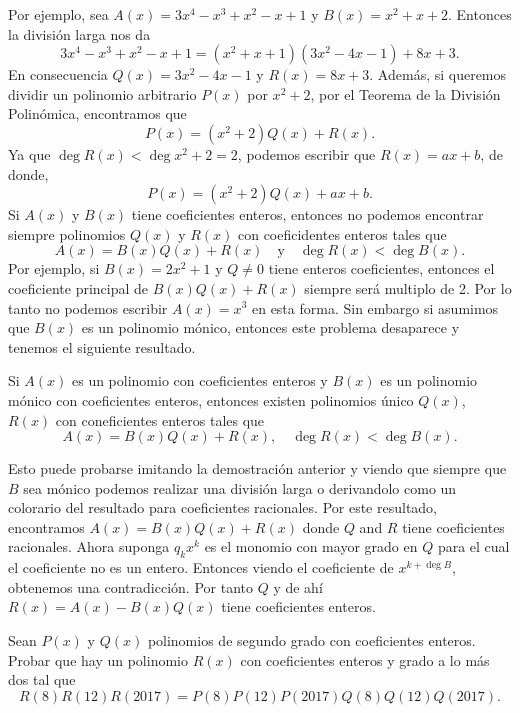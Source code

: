 Por ejemplo, sea $A(x) = 3x^4 - x^3 + x^2 - x + 1$ y $B(x) = x^2 + x + 2$.
Entonces la división larga nos da
\[
    3x^4 - x^3 + x^2 - x + 1 = (x^2 + x + 1)(3x^2 - 4x - 1) + 8x + 3.
\]
En consecuencia $Q(x) = 3x^2 - 4x - 1$ y $R(x) = 8x + 3$.
Además, si queremos dividir un polinomio arbitrario $P(x)$ por $x^2 + 2$, por el Teorema de la División Polinómica, encontramos que
\[
    P(x) = (x^2 + 2)Q(x) + R(x).
\]
Ya que $\deg{R(x)} < \deg{x^2 + 2} = 2$, podemos escribir que $R(x) = ax + b$, de donde,
\[
    P(x) = (x^2 + 2)Q(x) + ax + b.
\]
Si $A(x)$ y $B(x)$ tiene coeficientes enteros, entonces no podemos encontrar siempre polinomios $Q(x)$ y $R(x)$ con coeficidentes enteros tales que
\[
    A(x) = B(x) Q(x) + R(x) \quad \text{y} \quad \deg{R(x)} < \deg{B(x)}.
\]
Por ejemplo, si $B(x) = 2x^2 + 1$ y $Q \neq 0$ tiene enteros coeficientes, entonces el coeficiente principal de $B(x) Q(x) + R(x)$ siempre será multiplo de 2.
Por lo tanto no podemos escribir $A(x) = x^3$ en esta forma.
Sin embargo si asumimos que $B(x)$ es un polinomio mónico, entonces este problema desaparece y tenemos el siguiente resultado.

\begin{corollary}
    Si $A(x)$ es un polinomio con coeficientes enteros y $B(x)$ es un polinomio mónico con coeficientes enteros, entonces existen polinomios único $Q(x)$, $R(x)$ con coneficientes enteros tales que
    \[
        A(x) = B(x) Q(x) + R(x), \quad \deg{R(x)} < \deg{B(x)}.
    \]
\end{corollary}

Esto puede probarse imitando la demostración anterior y viendo que siempre que $B$ sea mónico podemos realizar una división larga o derivandolo como un colorario del resultado para coeficientes racionales.
Por este resultado, encontramos $A(x)=B(x)Q(x)+R(x)$ donde $Q$ and $R$ tiene coeficientes racionales.
Ahora suponga $q_k x^k$ es el monomio con mayor grado en $Q$ para el cual el coeficiente no es un entero.
Entonces viendo el coeficiente de $x^{k + \deg{B}}$, obtenemos una contradicción.
Por tanto $Q$ y de ahí $R(x)=A(x)-B(x)Q(x)$ tiene coeficientes enteros.

\begin{example}
    Sean $P(x)$ y $Q(x)$ polinomios de segundo grado con coeficientes enteros.
    Probar que hay un polinomio $R(x)$ con coeficientes enteros y grado a lo más dos tal que
    \[
        R(8)R(12)R(2017)=P(8)P(12)P(2017)Q(8)Q(12)Q(2017).
    \]
\end{example}

